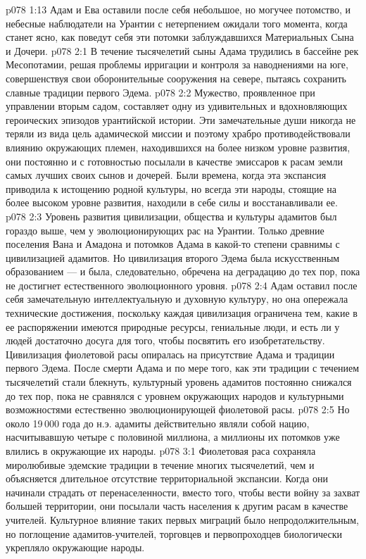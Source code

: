\vs p078 1:13 Адам и Ева оставили после себя небольшое, но могучее потомство, и небесные наблюдатели на Урантии с нетерпением ожидали того момента, когда станет ясно, как поведут себя эти потомки заблуждавшихся Материальных Сына и Дочери.
\vs p078 2:1 В течение тысячелетий сыны Адама трудились в бассейне рек Месопотамии, решая проблемы ирригации и контроля за наводнениями на юге, совершенствуя свои оборонительные сооружения на севере, пытаясь сохранить славные традиции первого Эдема.
\vs p078 2:2 Мужество, проявленное при управлении вторым садом, составляет одну из удивительных и вдохновляющих героических эпизодов урантийской истории. Эти замечательные души никогда не теряли из вида цель адамической миссии и поэтому храбро противодействовали влиянию окружающих племен, находившихся на более низком уровне развития, они постоянно и с готовностью посылали в качестве эмиссаров к расам земли самых лучших своих сынов и дочерей. Были времена, когда эта экспансия приводила к истощению родной культуры, но всегда эти народы, стоящие на более высоком уровне развития, находили в себе силы и восстанавливали ее.
\vs p078 2:3 Уровень развития цивилизации, общества и культуры адамитов был гораздо выше, чем у эволюционирующих рас на Урантии. Только древние поселения Вана и Амадона и потомков Адама в какой\hyp{}то степени сравнимы с цивилизацией адамитов. Но цивилизация второго Эдема была искусственным образованием ---  и была, следовательно, обречена на деградацию до тех пор, пока не достигнет естественного эволюционного уровня.
\vs p078 2:4 Адам оставил после себя замечательную интеллектуальную и духовную культуру, но она опережала технические достижения, поскольку каждая цивилизация ограничена тем, какие в ее распоряжении имеются природные ресурсы, гениальные люди, и есть ли у людей достаточно досуга для того, чтобы посвятить его изобретательству. Цивилизация фиолетовой расы опиралась на присутствие Адама и традиции первого Эдема. После смерти Адама и по мере того, как эти традиции с течением тысячелетий стали блекнуть, культурный уровень адамитов постоянно снижался до тех пор, пока не сравнялся с уровнем окружающих народов и культурными возможностями естественно эволюционирующей фиолетовой расы.
\vs p078 2:5 Но около 19\,000 года до н.э. адамиты действительно являли собой нацию, насчитывавшую четыре с половиной миллиона, а миллионы их потомков уже влились в окружающие их народы.
\vs p078 3:1 Фиолетовая раса сохраняла миролюбивые эдемские традиции в течение многих тысячелетий, чем и объясняется длительное отсутствие территориальной экспансии. Когда они начинали страдать от перенаселенности, вместо того, чтобы вести войну за захват большей территории, они посылали часть населения к другим расам в качестве учителей. Культурное влияние таких первых миграций было непродолжительным, но поглощение адамитов\hyp{}учителей, торговцев и первопроходцев биологически укрепляло окружающие народы.
